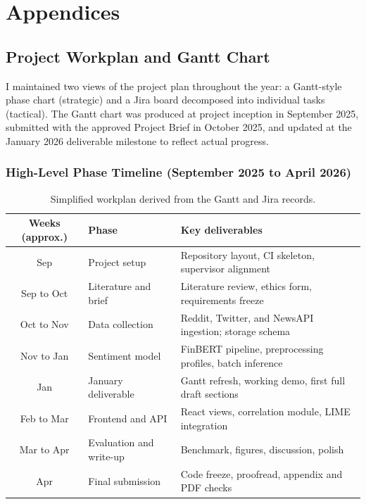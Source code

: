 \chapter{Appendices}
\label{appendix:supplementary}

\section{Project Workplan and Gantt Chart}
\label{app:gantt}

I maintained two views of the project plan throughout the year: a Gantt-style phase chart (strategic) and a Jira board decomposed into individual tasks (tactical). The Gantt chart was produced at project inception in September 2025, submitted with the approved Project Brief in October 2025, and updated at the January 2026 deliverable milestone to reflect actual progress.

\subsection*{High-Level Phase Timeline (September 2025 to April 2026)}

\begin{table}[!ht]
\centering
\small
\begin{tabular}{@{}cl>{\raggedright\arraybackslash}p{6.85cm}@{}}
\toprule
\textbf{Weeks (approx.)} & \textbf{Phase} & \textbf{Key deliverables} \\
\midrule
Sep          & Project setup         & Repository layout, CI skeleton, supervisor alignment \\
Sep to Oct     & Literature and brief  & Literature review, ethics form, requirements freeze \\
Oct to Nov     & Data collection       & Reddit, Twitter, and NewsAPI ingestion; storage schema \\
Nov to Jan     & Sentiment model       & FinBERT pipeline, preprocessing profiles, batch inference \\
Jan          & January deliverable   & Gantt refresh, working demo, first full draft sections \\
Feb to Mar     & Frontend and API      & React views, correlation module, LIME integration \\
Mar to Apr     & Evaluation and write-up & Benchmark, figures, discussion, polish \\
Apr          & Final submission      & Code freeze, proofread, appendix and PDF checks \\
\bottomrule
\end{tabular}
\caption{Simplified workplan derived from the Gantt and Jira records.}
\label{tab:appendix_workplan}
\end{table}

